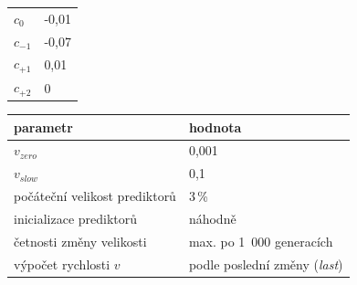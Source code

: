 \begin{table}[h]
{\begin{minipage}[t]{.3\textwidth}
\begin{tabular}{ll}
                $c_0$ & -0,01 \\
                $c_{-1}$ & -0,07 \\
                $c_{+1}$ & 0,01 \\
                $c_{+2}$ & 0 \\
                \bottomrule
            \end{tabular}
        \end{minipage}
        \begin{minipage}[t]{.7\textwidth}
            \centering\begin{tabular}{ll}
                \toprule
                parametr & hodnota \\
                \midrule
                $v_\mathit{zero}$ & 0,001 \\
                $v_\mathit{slow}$ & 0,1 \\
                počáteční velikost prediktorů & 3\,\% \\
                inicializace prediktorů & náhodně \\
                četnosti změny velikosti & max. po 1~000 generacích \\
                výpočet rychlosti $v$ & podle poslední změny (\emph{last}) \\
                \bottomrule
            \end{tabular}
        \end{minipage}
    }
\end{table}



